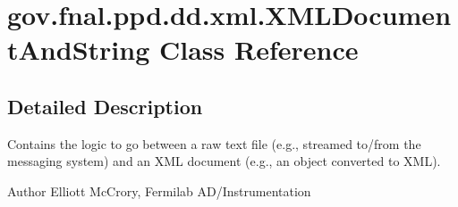 \hypertarget{classgov_1_1fnal_1_1ppd_1_1dd_1_1xml_1_1XMLDocumentAndString}{\section{gov.\-fnal.\-ppd.\-dd.\-xml.\-X\-M\-L\-Document\-And\-String Class Reference}
\label{classgov_1_1fnal_1_1ppd_1_1dd_1_1xml_1_1XMLDocumentAndString}
}


\subsection{Detailed Description}
Contains the logic to go between a raw text file (e.\-g., streamed to/from the messaging system) and an X\-M\-L document (e.\-g., an object converted to X\-M\-L).

\begin{DoxyAuthor}{Author}
Elliott Mc\-Crory, Fermilab A\-D/\-Instrumentation 
\end{DoxyAuthor}
